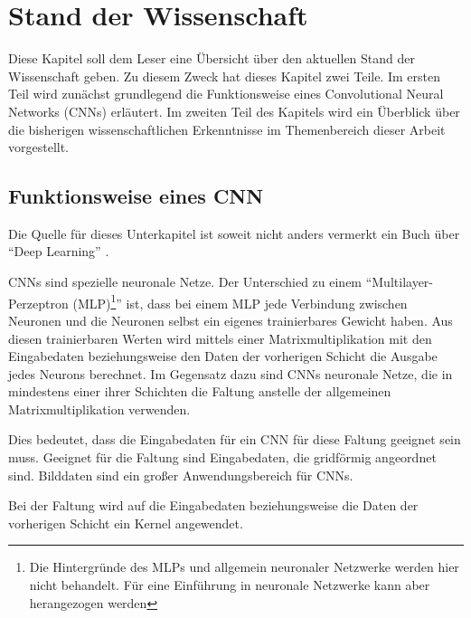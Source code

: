 \chapter{Stand der Wissenschaft}\label{sec:wissenschaft}
Diese Kapitel soll dem Leser eine Übersicht über den aktuellen Stand der Wissenschaft geben. Zu diesem Zweck hat dieses Kapitel zwei Teile. Im ersten Teil wird zunächst grundlegend die Funktionsweise eines Convolutional Neural Networks (CNNs) erläutert. Im zweiten Teil des Kapitels wird ein Überblick über die bisherigen wissenschaftlichen Erkenntnisse im Themenbereich dieser Arbeit vorgestellt.
\section{Funktionsweise eines CNN}\label{sec:conv}

Die Quelle für dieses Unterkapitel ist soweit nicht anders vermerkt ein Buch über \enquote{Deep Learning} \cite{CNNBook}.

CNNs sind spezielle neuronale Netze. Der Unterschied zu einem \enquote{Multilayer-Perzeptron (MLP)\footnote{Die Hintergründe des MLPs und allgemein neuronaler Netzwerke werden hier nicht behandelt. Für eine Einführung in neuronale Netzwerke kann aber \cite{neural} herangezogen werden}} ist, dass bei einem MLP jede Verbindung zwischen Neuronen und die Neuronen selbst ein eigenes trainierbares Gewicht haben. Aus diesen trainierbaren Werten wird mittels einer Matrixmultiplikation mit den Eingabedaten beziehungsweise den Daten der vorherigen Schicht die Ausgabe jedes Neurons berechnet.
Im Gegensatz dazu sind CNNs neuronale Netze, die in mindestens einer ihrer Schichten die Faltung anstelle der allgemeinen Matrixmultiplikation verwenden.


Dies bedeutet, dass die Eingabedaten für ein CNN für diese Faltung geeignet sein muss. Geeignet für die Faltung sind Eingabedaten, die gridförmig angeordnet sind. Bilddaten sind ein großer Anwendungsbereich für CNNs.

Bei der Faltung wird auf die Eingabedaten beziehungsweise die Daten der vorherigen Schicht ein Kernel angewendet.

